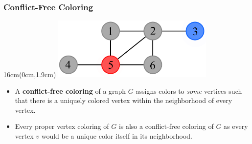 \documentclass[xcolor=dvipsnames,aspectratio=1610]{beamer}
\newcommand{\exampleheight}{1.9cm}
\newcommand{\examplewidth}{16cm}
\begin{document}
  \begin{frame}
    \frametitle{Conflict-Free Coloring}

    \begin{textblock*}{\examplewidth}(0cm,\exampleheight) %
      \centering
      \includegraphics[width=8cm]{../figures/example-cfcp.pdf}
    \end{textblock*}

    \vspace{4cm}
    \vfill

    \begin{itemize}
      \item<1-2> A \textbf{conflict-free coloring} of a graph $G$ assigns colors to \emph{some} vertices such that there is a uniquely colored vertex within the neighborhood of every vertex.
      \item<2> Every proper vertex coloring of $G$ is also a conflict-free coloring of $G$ as every vertex $v$ would be a unique color itself in its neighborhood.
    \end{itemize}
  \end{frame}
\end{document}
